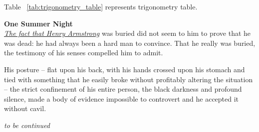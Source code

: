 Table ~\ref{tab:trigonometry_table} represents trigonometry table. 



\begin{center}
\textbf{One Summer Night}\\
\underline{\emph{The fact that Henry Armstrong}}  was buried did not seem to him to prove that he was dead: he had always been a hard man to convince. That he really was buried, the testimony of his senses compelled him to admit.\par 
His posture -- flat upon his back, with his hands crossed upon his stomach and tied with something that he easily broke without profitably altering the situation -- the strict confinement of his entire person, the black darkness and profound silence, made a body of evidence impossible to controvert and he accepted it without \small{cavil}. \par
\textit{to be continued}
\end{center}




